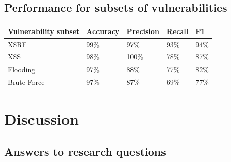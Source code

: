 \documentclass[
a4paper,
pagesize,
pdftex,
12pt,
twoside, %
BCOR=5mm, %
ngerman,
fleqn,
final,
]{scrartcl}
\begin{document}
	\subsection{Performance for subsets of vulnerabilities}
	
	
	
	\begin{tabular}{ | p{5cm} || p{2cm}|p{2cm}|p{2cm}|p{2cm}|  }
		\hline
		\textbf{Vulnerability subset} & \textbf{Accuracy} & \textbf{Precision} & \textbf{Recall} & \textbf{F1} \\
		\hline
		XSRF & 99\% & 97\% & 93\% & 94\% \\
		XSS & 98\% & 100\% & 78\% & 87\% \\
		Flooding & 97\% & 88\% & 77\% & 82\% \\
		Brute Force & 97\% & 87\% & 69\% & 77\% \\
		
		
		
		
		
		\hline
		\hline
	\end{tabular}
	
	
	
	\newpage
	\section{Discussion}
	
	
	\subsection{Answers to research questions}
	
\end{document}
